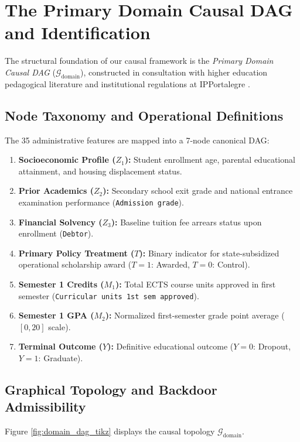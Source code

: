 \section{The Primary Domain Causal DAG and Identification}
\label{sec:meth_domain_dag}

The structural foundation of our causal framework is the \textit{Primary Domain Causal DAG} ($\mathcal{G}_{\text{domain}}$), constructed in consultation with higher education pedagogical literature and institutional regulations at IPPortalegre \parencite{martins2021predicting}.

\subsection{Node Taxonomy and Operational Definitions}

The 35 administrative features are mapped into a 7-node canonical DAG:
\begin{enumerate}
    \item \textbf{Socioeconomic Profile ($Z_1$):} Student enrollment age, parental educational attainment, and housing displacement status.
    \item \textbf{Prior Academics ($Z_2$):} Secondary school exit grade and national entrance examination performance (\texttt{Admission grade}).
    \item \textbf{Financial Solvency ($Z_3$):} Baseline tuition fee arrears status upon enrollment (\texttt{Debtor}).
    \item \textbf{Primary Policy Treatment ($T$):} Binary indicator for state-subsidized operational scholarship award ($T=1$: Awarded, $T=0$: Control).
    \item \textbf{Semester 1 Credits ($M_1$):} Total ECTS course units approved in first semester (\texttt{Curricular units 1st sem approved}).
    \item \textbf{Semester 1 GPA ($M_2$):} Normalized first-semester grade point average ($[0, 20]$ scale).
    \item \textbf{Terminal Outcome ($Y$):} Definitive educational outcome ($Y=0$: Dropout, $Y=1$: Graduate).
\end{enumerate}

\subsection{Graphical Topology and Backdoor Admissibility}

Figure \ref{fig:domain_dag_tikz} displays the causal topology $\mathcal{G}_{\text{domain}}$.

